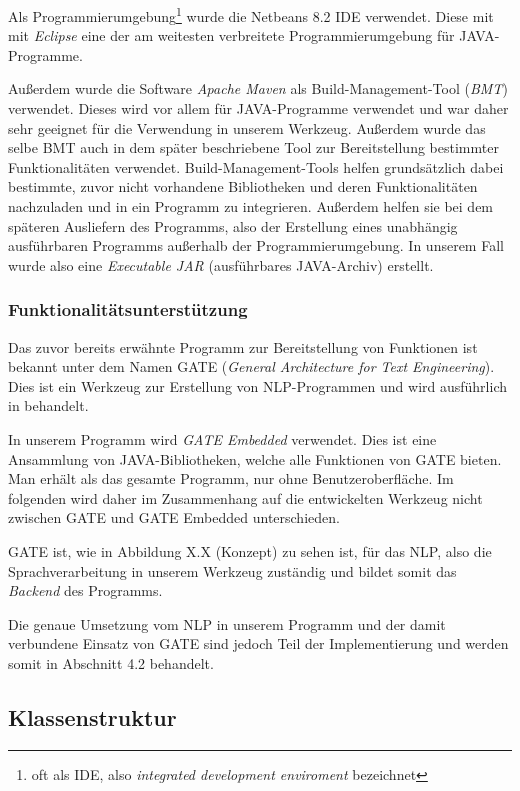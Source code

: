 \documentclass[12pt]{report}
\begin{document}
Als Programmierumgebung\footnote{oft als IDE, also \textit{integrated development enviroment} bezeichnet} wurde die Netbeans 8.2 IDE verwendet. Diese mit mit \textit{Eclipse} eine der am weitesten verbreitete Programmierumgebung für JAVA-Programme. 

Außerdem wurde die Software \textit{Apache Maven} als Build-Management-Tool (\textit{BMT}) verwendet. Dieses wird vor allem für JAVA-Programme verwendet und war daher sehr geeignet für die Verwendung in unserem Werkzeug. Außerdem wurde das selbe BMT auch in dem später beschriebene Tool zur Bereitstellung bestimmter Funktionalitäten verwendet. 
Build-Management-Tools helfen grundsätzlich dabei bestimmte, zuvor nicht vorhandene Bibliotheken und deren Funktionalitäten nachzuladen und in ein Programm zu integrieren. Außerdem helfen sie bei dem späteren Ausliefern des Programms, also der Erstellung eines unabhängig ausführbaren Programms außerhalb der Programmierumgebung.
In unserem Fall wurde also eine \textit{Executable JAR} (ausführbares JAVA-Archiv) erstellt. 

\subsubsection{Funktionalitätsunterstützung}

Das zuvor bereits erwähnte Programm zur Bereitstellung von Funktionen ist bekannt unter dem Namen GATE (\textit{General Architecture for Text Engineering}). Dies ist ein Werkzeug zur Erstellung von NLP-Programmen und wird ausführlich in \cite{rs18} behandelt. 

In unserem Programm wird \textit{GATE Embedded} verwendet. Dies ist eine Ansammlung von JAVA-Bibliotheken, welche alle Funktionen von GATE bieten. Man erhält als das gesamte Programm, nur ohne Benutzeroberfläche. Im folgenden wird daher im Zusammenhang auf die entwickelten Werkzeug nicht zwischen GATE und GATE Embedded unterschieden. 

GATE ist, wie in Abbildung X.X (Konzept) zu sehen ist, für das NLP, also die Sprachverarbeitung in unserem Werkzeug zuständig und bildet somit das \textit{Backend} des Programms.

Die genaue Umsetzung vom NLP in unserem Programm und der damit verbundene Einsatz von GATE sind jedoch Teil der Implementierung und werden somit in Abschnitt 4.2 behandelt.

\subsection{Klassenstruktur}
\end{document}
